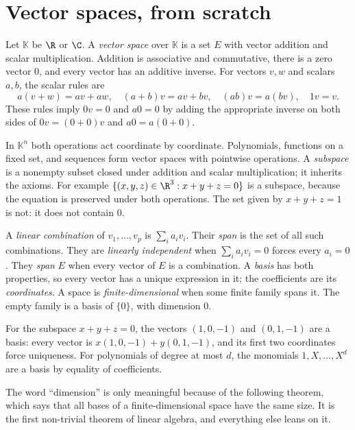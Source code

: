 \section{Vector spaces, from scratch}

\begin{definitionx}
Let $\mathbb K$ be $\R$ or $\C$. A \emph{vector space} over $\mathbb K$ is a set $E$ with vector addition and scalar multiplication. Addition is associative and commutative, there is a zero vector $0$, and every vector has an additive inverse. For vectors $v,w$ and scalars $a,b$, the scalar rules are
\[
a(v+w)=av+aw,\quad (a+b)v=av+bv,\quad (ab)v=a(bv),\quad 1v=v.
\]
These rules imply $0v=0$ and $a0=0$ by adding the appropriate inverse on both sides of $0v=(0+0)v$ and $a0=a(0+0)$.
\end{definitionx}

In $\mathbb K^n$ both operations act coordinate by coordinate. Polynomials, functions on a fixed set, and sequences form vector spaces with pointwise operations. A \emph{subspace} is a nonempty subset closed under addition and scalar multiplication; it inherits the axioms. For example $\{(x,y,z)\in\R^3:x+y+z=0\}$ is a subspace, because the equation is preserved under both operations. The set given by $x+y+z=1$ is not: it does not contain $0$.

A \emph{linear combination} of $v_1,\dots,v_p$ is $\sum_i a_iv_i$. Their \emph{span} is the set of all such combinations. They are \emph{linearly independent} when $\sum_i a_iv_i=0$ forces every $a_i=0$. They \emph{span} $E$ when every vector of $E$ is a combination. A \emph{basis} has both properties, so every vector has a unique expression in it; the coefficients are its \emph{coordinates}. A space is \emph{finite-dimensional} when some finite family spans it. The empty family is a basis of $\{0\}$, with dimension $0$.

For the subspace $x+y+z=0$, the vectors $(1,0,-1)$ and $(0,1,-1)$ are a basis: every vector is $x(1,0,-1)+y(0,1,-1)$, and its first two coordinates force uniqueness. For polynomials of degree at most $d$, the monomials $1,X,\dots,X^d$ are a basis by equality of coefficients.

The word ``dimension'' is only meaningful because of the following theorem, which says that all bases of a finite-dimensional space have the same size.
It is the first non-trivial theorem of linear algebra, and everything else leans on it.


